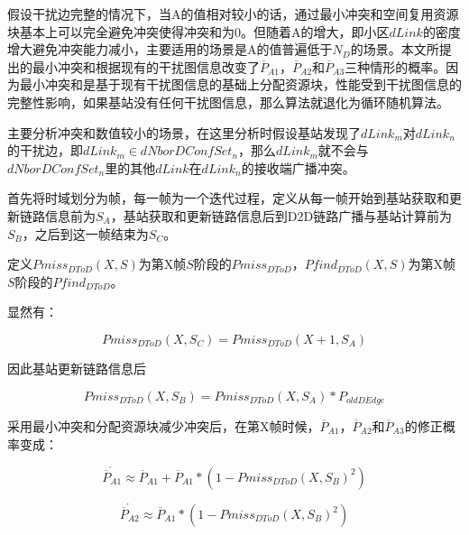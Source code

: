 \documentclass[figurelist,tablelist,algorithmlist,nomlist,masters]{seuthesix}
\begin{document}
	假设干扰边完整的情况下，当A的值相对较小的话，通过最小冲突和空间复用资源块基本上可以完全避免冲突使得冲突和为0。但随着A的增大，即小区$dLink$的密度增大避免冲突能力减小，主要适用的场景是A的值普遍低于$N_D$的场景。本文所提出的最小冲突和根据现有的干扰图信息改变了${\overline P_{A1}}$，${\overline P_{A2}}$和${\overline P_{A3}}$三种情形的概率。因为最小冲突和是基于现有干扰图信息的基础上分配资源块，性能受到干扰图信息的完整性影响，如果基站没有任何干扰图信息，那么算法就退化为循环随机算法。
	
	主要分析冲突和数值较小的场景，在这里分析时假设基站发现了$dLink_m$对$dLink_n$的干扰边，即$dLink_m \in dNborDConfSe{t_n}$，那么$dLink_m$就不会与$dNborDConfSe{t_n}$里的其他$dLink$在$dLink_n$的接收端广播冲突。
	
	首先将时域划分为帧，每一帧为一个迭代过程，定义从每一帧开始到基站获取和更新链路信息前为$S{_A}$，基站获取和更新链路信息后到D2D链路广播与基站计算前为$S{_B}$，之后到这一帧结束为$S{_C}$。
	
	定义$Pmis{s_{DToD}}(X,S)$为第X帧$S$阶段的$Pmis{s_{DToD}}$，$Pfin{d_{DToD}}(X,S)$为第X帧$S$阶段的$Pfin{d_{DToD}}$。
	
	显然有：
	
	\begin{equation}\label{eq3.1}
	Pmis{s_{DToD}}(X,S{_C}) = Pmis{s_{DToD}}(X + 1,S{_A})
	\end{equation}
	
	因此基站更新链路信息后
	
	\begin{equation}\label{eq3.2}
	Pmis{s_{DToD}}(X,S{_B}) = Pmis{s_{DToD}}(X,S{_A})*{P_{oldDEdge}}
	\end{equation}
	
	采用最小冲突和分配资源块减少冲突后，在第X帧时候，${\overline P _{A1}}$，${\overline P _{A2}}$和${\overline P _{A3}}$的修正概率变成：
	
	\begin{equation}\label{eq3.1}
	\acute{\overline P _{A1}} \approx {\overline P _{A1}} + {\overline P _{A1}} * (1 - Pmis{s_{DToD}}{(X,S{_B})^2})
	\end{equation}
	
	\begin{equation}\label{eq3.1}
	\acute{\overline P _{A2}} \approx {\overline P _{A1}} * (1 - Pmis{s_{DToD}}{(X,S{_B})^2})
	\end{equation}
	
\end{document}
